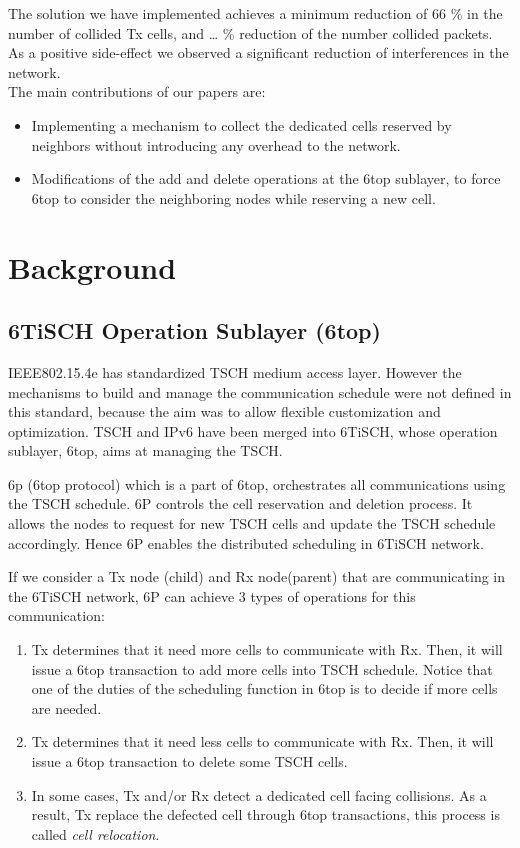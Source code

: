\documentclass[10pt, conference, compsocconf]{IEEEtran}
\begin{document}
The solution we have implemented achieves a minimum reduction of 66 \% in the number of collided Tx cells, and … \% reduction of the number collided packets. As a positive side-effect we observed a significant reduction of interferences in the network. \\

The main contributions of our papers are:

\begin{itemize}
\item Implementing a mechanism to collect the dedicated cells reserved by neighbors without introducing any overhead to the network. 
\item Modifications of the add and delete operations at the 6top sublayer, to force 6top to consider the neighboring nodes while reserving a new cell.
\end{itemize}

\section{Background}

\subsection{6TiSCH Operation Sublayer (6top)} 

IEEE802.15.4e has standardized TSCH medium access layer. However the mechanisms to build and manage the communication schedule were not defined in this standard, because the aim was to allow flexible customization and optimization. TSCH and IPv6 have been merged into 6TiSCH, whose operation sublayer, 6top, aims at managing the TSCH.

6p (6top protocol) which is a part of 6top, orchestrates all communications using the TSCH schedule. 6P controls the cell reservation and deletion process. It allows the nodes to request for new TSCH cells and update the TSCH schedule accordingly. Hence 6P enables the distributed scheduling in 6TiSCH network.

If we consider a Tx node (child) and Rx node(parent) that are communicating in the 6TiSCH network, 6P can achieve 3 types of operations for this communication: 
\begin{enumerate}

\item Tx determines that it need more cells to communicate with Rx. Then, it  will issue a 6top transaction to add more cells into TSCH schedule. Notice that one of  the duties of the scheduling function in 6top is to decide if more cells are needed.

\item Tx determines that it need less cells to communicate with Rx. Then, it will issue a 6top transaction to delete some TSCH cells. 

\item In some cases, Tx and/or Rx detect a dedicated cell facing collisions. As a result, Tx replace the defected cell through 6top transactions, this process is called {\em cell relocation}.
 
\end{enumerate}
\end{document}
